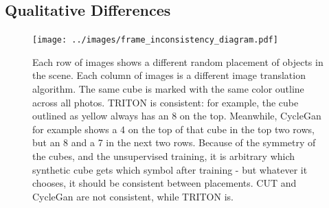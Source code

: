 \documentclass{article}
\begin{document}





\label{sec:results}


\subsection{Qualitative Differences}
\begin{figure}[H]
	\begin{center}
		\texttt{[image: ../images/frame\_inconsistency\_diagram.pdf]}
	\end{center}
	
	
	\caption{
		Each row of images shows a different random placement of objects in the scene.
		Each column of images is a different image translation algorithm.
		The same cube is marked with the same color outline across all photos.
		TRITON is consistent: for example, the cube outlined as yellow always has an 8 on the top.
		Meanwhile, CycleGan for example shows a 4 on the top of that cube in the top two rows, but an 8 and a 7 in the next two rows.
		Because of the symmetry of the cubes, and the unsupervised training, it is arbitrary which synthetic cube gets which symbol after training - but whatever it chooses, it should be consistent between placements.
		CUT and CycleGan are not consistent, while TRITON is.
		}
		\label{fig:frame_inconsistency_diagram}
	\end{figure}
	
\end{document}
